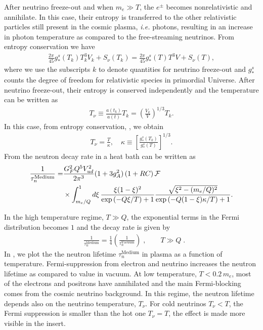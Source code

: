 After neutrino freeze-out and when $m_e\gg T$, the $e^{\pm}$ becomes nonrelativistic and annihilate. In this case, their entropy is transferred to the other relativistic particles still present in the cosmic plasma, {\it i.e.\/} photons, resulting in an increase in photon temperature as compared to the free-streaming neutrinos. From entropy conservation we have
\begin{align}
\label{Entropy}
\frac{2\pi}{45}g^s_\ast(T_k)T^3_kV_k+S_{\nu}(T_k)=\frac{2\pi}{45}g^s_\ast(T)T^3V+S_{\nu}(T),
\end{align}
where we use the subscripts $k$ to denote quantities for neutrino freeze-out and $g^s_\ast$ counts the degree of freedom for relativistic species in primordial Universe. After neutrino freeze-out, their entropy is conserved independently and the temperature can be written as
\begin{align}
T_\nu\equiv\frac{a(t_k)}{a(t)}T_k=\left(\frac{V_k}{V}\right)^{1/3}T_k.
\end{align}
In this case, from entropy conservation, , we obtain
\begin{align}
\label{Neutrino_Photon}
T_\nu=\frac{T}{\kappa},\,\,\,\,\,\,\kappa\equiv\left[\frac{g^s_\ast(T_k)}{g^s_\ast(T)}\right]^{1/3}.
\end{align}
From  the neutron decay rate in a heat bath can be written as
\begin{align}
\label{Decay_rate_03}
\frac{1}{\tau_n^\mathrm{Medium}}=&\frac{G^2_FQ^5V^2_{ud}}{2\pi^3}(1+3g^2_A)\,(1+RC)\,\mathcal{F}\\
&\times\int^1_{m_e/Q}d\xi\,\frac{\xi(1-\xi)^2}{\exp\left(-Q\xi/{T}\right)+1}\frac{\sqrt{\xi^2-(m_e/Q)^2}}{\exp\left(-Q(1-\xi)\kappa/T\right)+1}.\notag
\end{align}

In the high temperature regime, $T\gg Q$, the exponential terms in the Fermi distribution becomes $1$ and the decay rate is given by
\begin{align}
&\frac{1}{\tau_n^\mathrm{Medium}}=\frac{1}{4}\left(\frac{1}{\tau_n^\mathrm{Vacuum}}\right)\;,
\qquad
T\gg Q\;.
\end{align}
In , we plot the the neutron lifetime $\tau^\mathrm{Medium}_n$ in plasma as a function of temperature. Fermi-suppression from electron and neutrino increases the neutron lifetime as compared to value in vacuum. At low temperature, $T<0.2\,m_e$, most of the electrons and positrons have annihilated and the main Fermi-blocking comes from the cosmic neutrino background. In this regime, the neutron lifetime depends also on the neutrino temperature, $T_\nu$. For cold neutrinos $T_\nu<T$, the Fermi suppression is smaller than the hot one $T_\nu=T$, the effect is made more visible in the insert.

